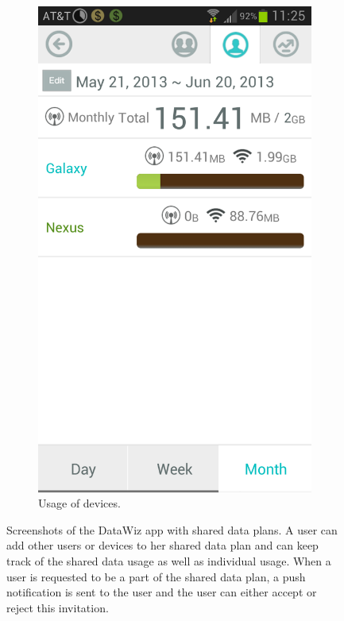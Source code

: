 \begin{figure}
\begin{subfigure}[b]{0.23\textwidth}
	\includegraphics[width = \textwidth]{Figures/Devices.png}
	\caption{Usage of devices.}
	\label{fig:datawiz_device}
	\end{subfigure}
\caption{Screenshots of the DataWiz app with shared data plans. A user can add other users or devices to her shared data plan and can keep track of the shared data usage as well as individual usage. When a user is requested to be a part of the shared data plan, a push notification is sent to the user and the user can either accept or reject this invitation.}
\label{fig:datawiz}
\end{figure}


